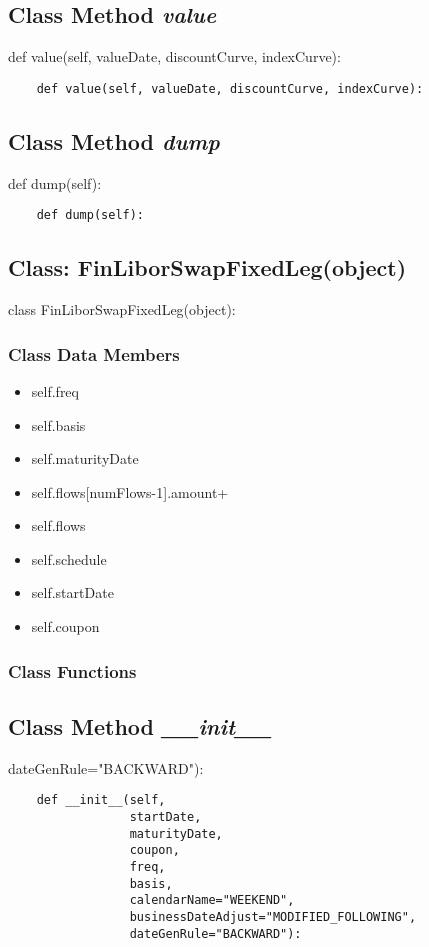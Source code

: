 \documentclass[twoside,11pt]{book}
\begin{document}
\subsection{Class Method {\it value}}
def value(self, valueDate, discountCurve, indexCurve):

\begin{lstlisting}
    def value(self, valueDate, discountCurve, indexCurve):
\end{lstlisting}

\subsection{Class Method {\it dump}}
def dump(self):

\begin{lstlisting}
    def dump(self):
\end{lstlisting}

\subsection{Class: FinLiborSwapFixedLeg(object)}
class FinLiborSwapFixedLeg(object):

\subsubsection{Class Data Members}
\begin{itemize}
\item{self.freq}
\item{self.basis}
\item{self.maturityDate}
\item{self.flows[numFlows-1].amount+}
\item{self.flows}
\item{self.schedule}
\item{self.startDate}
\item{self.coupon}
\end{itemize}

\subsubsection{Class Functions}

\subsection{Class Method {\it \_\_init\_\_}}
dateGenRule="BACKWARD"):

\begin{lstlisting}
    def __init__(self,
                 startDate,
                 maturityDate,
                 coupon,
                 freq,
                 basis,
                 calendarName="WEEKEND",
                 businessDateAdjust="MODIFIED_FOLLOWING",
                 dateGenRule="BACKWARD"):
\end{lstlisting}
\end{document}
